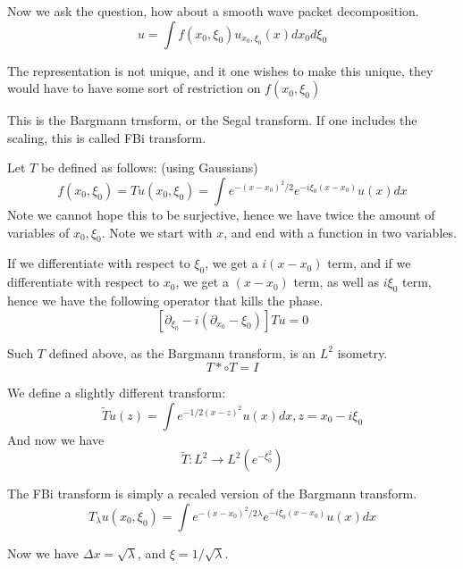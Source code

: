 Now we ask the question, how about a smooth wave packet decomposition.
\begin{equation*}
    u=\int f(x_0, \xi_0)u_{x_0, \xi_0}(x)dx_0d\xi_0
\end{equation*}
\begin{remark}
    The representation is not unique, and it one wishes to make this unique, they would have to have some sort of restriction on $f(x_0, \xi_0)$
\end{remark}

This is the Bargmann trnsform, or the Segal transform. If one includes the scaling, this is called FBi transform.

\begin{definition}
    Let $T$ be defined as follows: (using Gaussians)
    \begin{equation*}
        f(x_0, \xi_0)=Tu(x_0, \xi_0)=\int e^{-(x-x_0)^2/2}e^{-i\xi_0(x-x_0)}u(x)dx
    \end{equation*}
    Note we cannot hope this to be surjective, hence we have twice the amount of variables of $x_0, \xi_0$. Note we start with $x$, and end with a function in two variables.
\end{definition}

If we differentiate with respect to $\xi_0$, we get a $i(x-x_0)$ term, and if we differentiate with respect to $x_0$, we get a $(x-x_0)$ term, as well as $i \xi_0$ term, hence we have the following operator that kills the phase.
\begin{equation*}
    \left[\partial_{\xi_0}-i(\partial_{x_0}-\xi_0)\right]Tu=0
\end{equation*}

\begin{proposition}
    Such $T$ defined above, as the Bargmann transform, is an $L^2$ isometry.
    \begin{equation*}
        T*\circ T=I
    \end{equation*}
\end{proposition}


We define a slightly different transform:
\begin{equation*}
    \tilde{T}u(z)=\int e^{-1/2(x-z)^2}u(x)dx, z=x_0-i\xi_0
\end{equation*}
And now we have
\begin{equation*}
    \tilde{T}: L^2\to L^2(e^{-\xi_0^2})
\end{equation*}


\begin{definition}
    The FBi transform is simply a recaled version of the Bargmann transform.
    \begin{equation*}
        T_\lambda u(x_0, \xi_0)=\int e^{-(x-x_0)^2/2\lambda}e^{-i\xi_0(x-x_0)}u(x)dx
    \end{equation*}
\end{definition}
Now we have $\Delta x=\sqrt{\lambda}$, and $\xi=1/\sqrt{\lambda}$.

